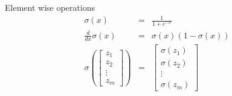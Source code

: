 \begin{frame}{Element wise operations}
	\begin{align}
	\sigma(x)  &=& \frac{1}{1+e^{-x}}  \\
	\frac{d}{d x}\sigma(x) & = & \sigma(x) (1-\sigma(x)) \\
	\sigma(
		\begin{bmatrix}
			z_1 \\
			z_2 \\
			\vdots \\
			z_m
		\end{bmatrix}
	) & = & 
	\begin{bmatrix}
		\sigma(z_1) \\
		\sigma(z_2) \\
		\vdots \\
		\sigma(z_m)
	\end{bmatrix}
	\end{align}
\end{frame}